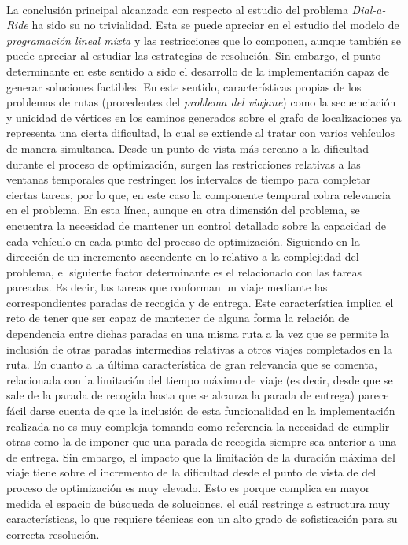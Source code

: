 \documentclass{subfiles}
\begin{document}
      \paragraph{}
      La conclusión principal alcanzada con respecto al estudio del problema \emph{Dial-a-Ride} ha sido su no trivialidad. Esta se puede apreciar en el estudio del modelo de \emph{programación lineal mixta} y las restricciones que lo componen, aunque también se puede apreciar al estudiar las estrategias de resolución. Sin embargo, el punto determinante en este sentido a sido el desarrollo de la implementación capaz de generar soluciones factibles. En este sentido, características propias de los problemas de rutas (procedentes del \emph{problema del viajane}) como la secuenciación y unicidad de vértices en los caminos generados sobre el grafo de localizaciones ya representa una cierta dificultad, la cual se extiende al tratar con varios vehículos de manera simultanea. Desde un punto de vista más cercano a la dificultad durante el proceso de optimización, surgen las restricciones relativas a las ventanas temporales que restringen los intervalos de tiempo para completar ciertas tareas, por lo que, en este caso la componente temporal cobra relevancia en el problema. En esta línea, aunque en otra dimensión del problema, se encuentra la necesidad de mantener un control detallado sobre la capacidad de cada vehículo en cada punto del proceso de optimización. Siguiendo en la dirección de un incremento ascendente en lo relativo a la complejidad del problema, el siguiente factor determinante es el relacionado con las tareas pareadas. Es decir, las tareas que conforman un viaje mediante las correspondientes paradas de recogida y de entrega. Este característica implica el reto de tener que ser capaz de mantener de alguna forma la relación de dependencia entre dichas paradas en una misma ruta a la vez que se permite la inclusión de otras paradas intermedias relativas a otros viajes completados en la ruta. En cuanto a la última característica de gran relevancia que se comenta, relacionada con la limitación del tiempo máximo de viaje (es decir, desde que se sale de la parada de recogida hasta que se alcanza la parada de entrega) parece fácil darse cuenta de que la inclusión de esta funcionalidad en la implementación realizada no es muy compleja tomando como referencia la necesidad de cumplir otras como la de imponer que una parada de recogida siempre sea anterior a una de entrega. Sin embargo, el impacto que la limitación de la duración máxima del viaje tiene sobre el incremento de la dificultad desde el punto de vista de del proceso de optimización es muy elevado. Esto es porque complica en mayor medida el espacio de búsqueda de soluciones, el cuál restringe a estructura muy características, lo que requiere técnicas con un alto grado de sofisticación para su correcta resolución.
\end{document}
